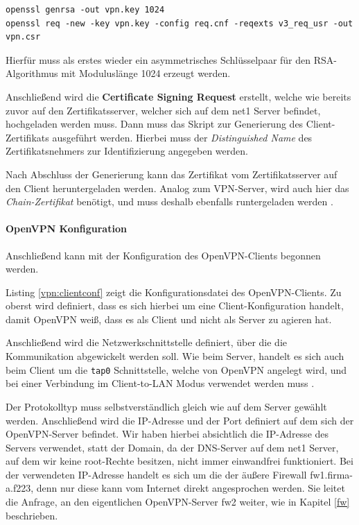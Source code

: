 \begin{lstlisting}
openssl genrsa -out vpn.key 1024
openssl req -new -key vpn.key -config req.cnf -reqexts v3_req_usr -out vpn.csr
\end{lstlisting}

Hierfür muss als erstes wieder ein asymmetrisches Schlüsselpaar für den RSA-Algorithmus mit Moduluslänge 1024 erzeugt werden.

Anschließend wird die \textbf{Certificate Signing Request} erstellt, welche wie bereits zuvor auf den Zertifikatsserver, welcher sich auf dem net1 Server befindet, hochgeladen werden muss. Dann muss das Skript zur Generierung des Client-Zertifikats ausgeführt werden. Hierbei muss der \emph{Distinguished Name} des Zertifikatsnehmers zur Identifizierung angegeben werden.

Nach Abschluss der Generierung kann das Zertifikat vom Zertifikatsserver auf den Client heruntergeladen werden. Analog zum VPN-Server, wird auch hier das \emph{Chain-Zertifikat} benötigt, und muss deshalb ebenfalls runtergeladen werden  \cite{Neuschwander2014}.

\paragraph{OpenVPN Konfiguration}

Anschließend kann mit der Konfiguration des OpenVPN-Clients begonnen werden.



Listing \ref{vpn:clientconf} zeigt die Konfigurationsdatei des OpenVPN-Clients. Zu oberst wird definiert, dass es sich hierbei um eine Client-Konfiguration handelt, damit OpenVPN weiß, dass es als Client und nicht als Server zu agieren hat.

Anschließend wird die Netzwerkschnittstelle definiert, über die die Kommunikation abgewickelt werden soll. Wie beim Server, handelt es sich auch beim Client um die \texttt{tap0} Schnittstelle, welche von OpenVPN angelegt wird, und bei einer Verbindung im Client-to-LAN Modus verwendet werden muss \cite{OpenVPN}.

Der Protokolltyp muss selbstverständlich gleich wie auf dem Server gewählt werden. Anschließend wird die IP-Adresse und der Port definiert auf dem sich der OpenVPN-Server befindet. Wir haben hierbei absichtlich die IP-Adresse des Servers verwendet, statt der Domain, da der DNS-Server auf dem net1 Server, auf dem wir keine root-Rechte besitzen, nicht immer einwandfrei funktioniert. Bei der verwendeten IP-Adresse handelt es sich um die der äußere Firewall fw1.firma-a.f223, denn nur diese kann vom Internet direkt angesprochen werden. Sie leitet die Anfrage, an den eigentlichen OpenVPN-Server fw2 weiter, wie in Kapitel \ref{fw} beschrieben.


